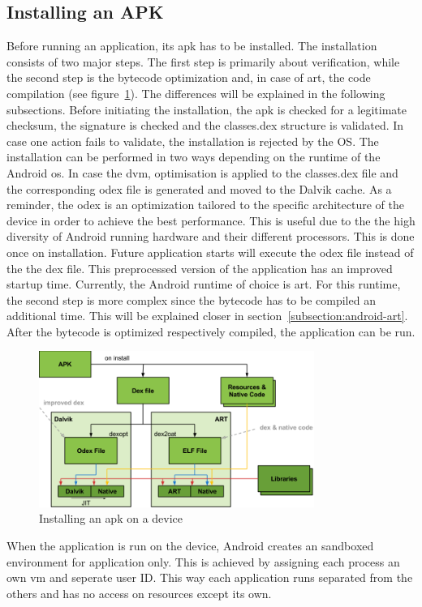 \subsection{Installing an APK} \label{subsection:android-install}
Before running an application, its \gls{apk} has to be installed.
The installation consists of two major steps.
The first step is primarily about verification, while the second step is the bytecode optimization and, in case of \gls{art}, the code compilation (see figure~\ref{fig:install}).
The differences will be explained in the following subsections.
\newline
Before initiating the installation, the \gls{apk} is checked for a legitimate checksum, the signature is checked and the classes.dex structure is validated.
In case one action fails to validate, the installation is rejected by the OS.
\newline
The installation can be performed in two ways depending on the runtime of the Android \gls{os}.
In case the \gls{dvm}, optimisation is applied to the classes.dex file and the corresponding \gls{odex} file is generated and moved to the Dalvik cache.
As a reminder, the \gls{odex} is an optimization tailored to the specific architecture of the device in order to achieve the best performance.
This is useful due to the the high diversity of Android running hardware and their different processors.
This is done once on installation.
Future application starts will execute the \gls{odex} file instead of the the \gls{dex} file.
This preprocessed version of the application has an improved startup time. \cite{kovachevaMaster}
\newline
Currently, the Android runtime of choice is \gls{art}.
For this runtime, the second step is more complex since the bytecode has to be compiled an additional time.
This will be explained closer in section~\ref{subsection:android-art}.
\newline
After the bytecode is optimized respectively compiled, the application can be run.
\newline
\begin{figure}[h]
    \centering
    \includegraphics[width=0.8\textwidth]{data/install.png}
    \caption{Installing an \gls{apk} on a device \cite{googleIOArt}}
    \label{fig:install}
\end{figure}
When the application is run on the device, Android creates an sandboxed environment for application only.
This is achieved by assigning each process an own \gls{vm} and seperate user ID.
This way each application runs separated from the others and has no access on resources except its own. \cite{developerFundamentals}
